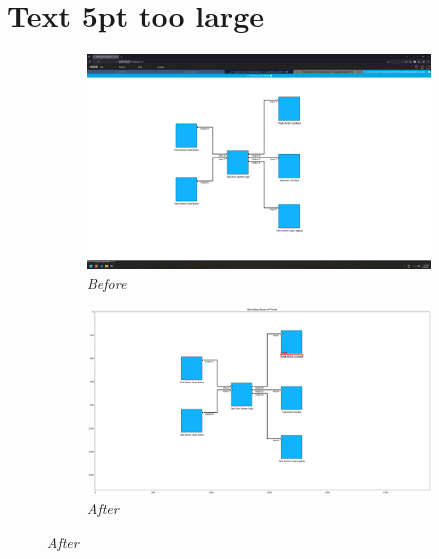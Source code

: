 \documentclass{article}
\begin{document}
\section{Text 5pt too large}
\begin{figure}[H]
    \centering
    \begin{subfigure}[t]{0.9\textwidth}
        \centering
        \includegraphics[width=\textwidth]{testcases/text_5pt_too_large/154503-258136_input_image.png}
        \caption*{\textit{Before}}
    \end{subfigure}
    \newline
    \begin{subfigure}[t]{0.9\textwidth}
        \centering
        \includegraphics[width=\textwidth]{testcases/text_5pt_too_large/154516-359589_element_bbox_errors_labeled_colored.png}
        \caption*{\textit{After}}
    \end{subfigure}
    \label{fig:text_too_large_5}
\end{figure}
\newpage
\end{document}
